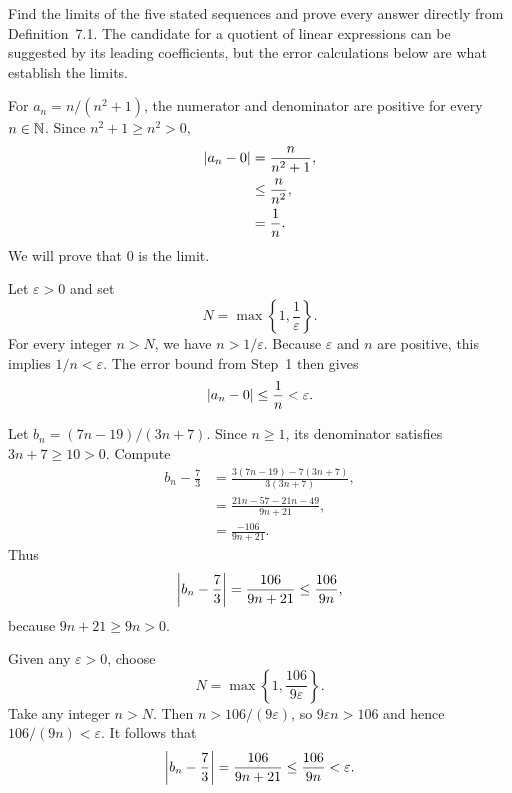 
\goal Find the limits of the five stated sequences and prove every
answer directly from Definition~7.1. The candidate for a quotient of
linear expressions can be suggested by its leading coefficients, but
the error calculations below are what establish the limits.

For $a_n=n/(n^2+1)$, the numerator and denominator are positive for
every $n\in\mathbb{N}$. Since $n^2+1\ge n^2>0$,
\begin{align*}
 \left|a_n-0\right|
   &=\frac{n}{n^2+1},\\
   &\le\frac{n}{n^2},\\
   &=\frac1n.
\end{align*}
We will prove that $0$ is the limit.

Let $\varepsilon>0$ and set
\[
 N=\max\left\{1,\frac1\varepsilon\right\}.
\]
For every integer $n>N$, we have $n>1/\varepsilon$.
Because $\varepsilon$ and $n$ are positive, this implies
$1/n<\varepsilon$. The error bound from Step~1 then gives
\[
 \left|a_n-0\right|\le\frac1n<\varepsilon.
\]


Let $b_n=(7n-19)/(3n+7)$. Since $n\ge1$, its denominator satisfies
$3n+7\ge10>0$. Compute
\begin{align*}
 b_n-\frac73
   &=\frac{3(7n-19)-7(3n+7)}{3(3n+7)},\\
   &=\frac{21n-57-21n-49}{9n+21},\\
   &=\frac{-106}{9n+21}.
\end{align*}
Thus
\[
 \left|b_n-\frac73\right|=\frac{106}{9n+21}
   \le\frac{106}{9n},
\]
because $9n+21\ge9n>0$.

Given any $\varepsilon>0$, choose
\[
 N=\max\left\{1,\frac{106}{9\varepsilon}\right\}.
\]
Take any integer $n>N$. Then $n>106/(9\varepsilon)$, so
$9\varepsilon n>106$ and hence $106/(9n)<\varepsilon$.
It follows that
\[
 \left|b_n-\frac73\right|
   =\frac{106}{9n+21}\le\frac{106}{9n}<\varepsilon.
\]


